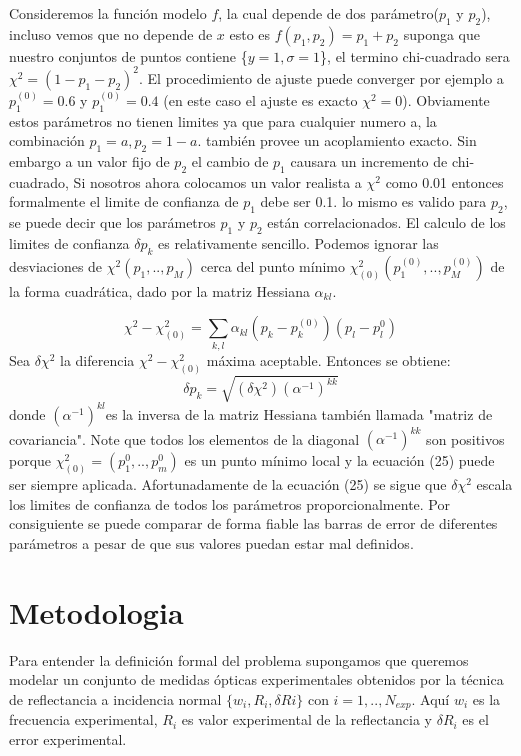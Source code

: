 \documentclass[a4paper,openright,12pt]{book}
\begin{document}
Consideremos la función modelo  $f$, la cual depende de dos parámetro($p_{1}$ y $p_{2}$), incluso vemos que no depende de $x$ esto es $f(p_{1},p_{2})=p_{1}+p_{2}$ suponga que nuestro conjuntos de puntos contiene \{$y=1,\sigma=1$\}, el termino chi-cuadrado sera $\chi^{2}=(1-p_{1}-p_{2})^{2}$. El procedimiento de ajuste puede converger por ejemplo a $p_{1}^{(0)}=0.6$ y $p_{1}^{(0)}=0.4$ (en este caso el ajuste es exacto $\chi^{2}=0$).
Obviamente estos parámetros no tienen limites ya que para cualquier numero a, la combinación $p_{1}=a,p_{2}=1-a.$ también provee un acoplamiento exacto. Sin embargo a un valor fijo de $p_{2}$ el cambio de $p_{1}$  causara un incremento de chi-cuadrado, Si nosotros ahora colocamos un valor realista a $\chi^{2}$ como 0.01 entonces formalmente el limite de confianza de $p_{1}$ debe ser 0.1. lo mismo es valido para $p_{2}$, se puede decir que los parámetros $p_{1}$ y $p_{2}$ están correlacionados.
El calculo de los limites de confianza $\delta p_{k}$ es relativamente sencillo. Podemos ignorar las desviaciones de $\chi^{2}(p_{1},..,p_{M})$ cerca del punto mínimo  $\chi_{(0)}^{2}(p_{1}^{(0)},..,p_{M}^{(0)})$ de la forma cuadrática, dado por la matriz Hessiana $\alpha_{kl}$\cite{guide}.

\begin{equation}
\chi^{2}-\chi_{(0)}^{2}=\sum_{k,l}\alpha_{kl}(p_{k}-p_{k}^{(0)})(p_{l}-p_{l}^{0})
\end{equation}
Sea $\delta\chi^{2}$ la diferencia $\chi^{2}-\chi_{(0)}^{2} $ máxima aceptable. Entonces se obtiene:
\begin{equation}
\delta p_{k}=\sqrt{(\delta \chi^{2})(\alpha^{-1})^{kk}}
\end{equation}
donde $ (\alpha^{-1})^{kl}$es la inversa de la matriz Hessiana también llamada "matriz de covariancia". Note que todos los elementos de la diagonal $ (\alpha^{-1})^{kk}$ son positivos porque $\chi_{(0)}^{2}=(p_{1}^{0},..,p_{m}^{0})$ es un punto mínimo local y la ecuación (25) puede ser siempre aplicada. Afortunadamente de la ecuación (25) se sigue que $\delta\chi^{2}$ escala los limites de confianza de todos los parámetros proporcionalmente. Por consiguiente se puede comparar de forma fiable las barras de error de diferentes parámetros a pesar de que sus valores puedan estar mal definidos\cite{guide}.
\chapter{Metodologia}

Para entender la definición formal del problema supongamos que queremos modelar un conjunto de medidas ópticas experimentales obtenidos por la técnica de reflectancia a incidencia normal $\{w_{i}, R_{i},\delta R{i} \} $ con $i= 1,..,N_{exp}$. Aquí $w_{i}$ es la frecuencia experimental, $R_{i}$ es valor experimental de la reflectancia  y  $\delta R_{i}$ es el error experimental.
\end{document}
